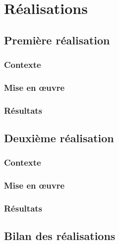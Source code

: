 \chapter{Réalisations}
    \lipsum[1]

\section{Première réalisation}
    \lipsum[1-2]

    \subsection{Contexte}
        \lipsum[1]

    \subsection{Mise en œuvre}
        \lipsum[1-2]

    \subsection{Résultats}
        \lipsum[1]


\section{Deuxième réalisation}
    \lipsum[1-2]

    \subsection{Contexte}
        \lipsum[1]

    \subsection{Mise en œuvre}
        \lipsum[1-2]

    \subsection{Résultats}
        \lipsum[1]


\section{Bilan des réalisations}
    \lipsum[1-2]
